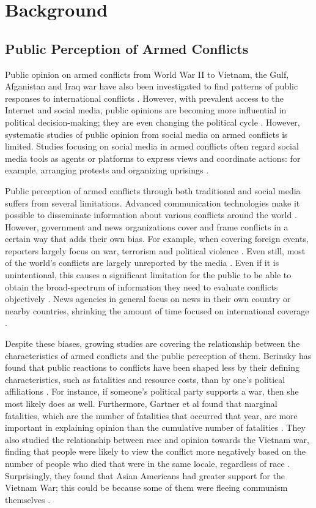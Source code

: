 \section{Background}
\subsection{Public Perception of Armed Conflicts}
Public opinion on armed conflicts from World War II to Vietnam, the Gulf, Afganistan and Iraq war have also been investigated to find patterns of public responses to international conflicts \cite{Berinsky2009}. However, with prevalent access to the Internet and social media, public opinions are becoming more influential in political decision-making; they are even changing the political cycle \cite{Shirky2011}. However, systematic studies of public opinion from social media on armed conflicts is limited. Studies focusing on social media in armed conflicts often regard social media tools as agents or platforms to express views and coordinate actions: for example, arranging protests and organizing uprisings \cite{Lim2012}.

Public perception of armed conflicts through both traditional and social media suffers from several limitations. Advanced communication technologies make it possible to disseminate information about various conflicts around the world \cite{Sacco2015}. However, government and news organizations cover and frame conflicts in a certain way that adds their own bias. For example, when covering foreign events, reporters largely focus on war, terrorism and political violence \cite{Nossek2004}. Even still, most of the world's conflicts are largely unreported by the media \cite{Hawkins2011}. Even if it is unintentional, this causes a significant limitation for the public to be able to obtain the broad-spectrum of information they need to evaluate conflicts objectively \cite{Nelson1997}. News agencies in general focus on news in their own country or nearby countries, shrinking the amount of time focused on international coverage \cite{Seib2004}.

Despite these biases, growing studies are covering the relationship between the characteristics of armed conflicts and the public perception of them. Berinsky has found that public reactions to conflicts have been shaped less by their defining characteristics, such as fatalities and resource costs, than by one's political affiliations \cite{Berinsky2009}. For instance, if someone's political party supports a war, then she most likely does as well. Furthermore, Gartner et al found that marginal fatalities, which are the number of fatalities that occurred that year, are more important in explaining opinion than the cumulative number of fatalities \cite{Gartner1998}. They also studied the relationship between race and opinion towards the Vietnam war, finding that people were likely to view the conflict more negatively based on the number of people who died that were in the same locale, regardless of race \cite{Gartner2000}. Surprisingly, they found that Asian Americans had greater support for the Vietnam War; this could be because some of them were fleeing communism themselves \cite{Gartner2000}. 

